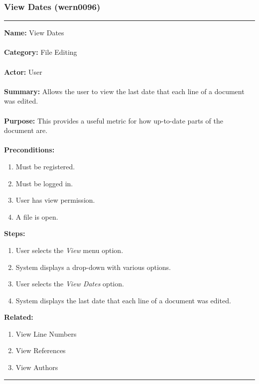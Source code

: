 \documentclass[11pt]{report}
\begin{document}
\subsubsection{View Dates (wern0096)}
\vspace{2pt}
\hrule
\vspace{8pt}
	\noindent\textbf{Name:} View Dates \\ \\
	\textbf{Category:} File Editing \\ \\
	\textbf{Actor:} User \\ \\
	\textbf{Summary:} Allows the user to view the last date that each line of a document was edited. \\ \\
	\textbf{Purpose:} This provides a useful metric for how up-to-date parts of the document are. \\ \\
	\textbf{Preconditions:} 
	\begin{enumerate}
		\item Must be registered.
		\item Must be logged in.
		\item User has view permission.
		\item A file is open.
	\end{enumerate}
	\textbf{Steps:}
	\begin{enumerate}
		\item User selects the \textit{View} menu option.
		\item System displays a drop-down with various options.
		\item User selects the \textit{View Dates} option.
		\item System displays the last date that each line of a document was edited.
	\end{enumerate}
	\textbf{Related:}
	\begin{enumerate}
		\item View Line Numbers
		\item View References
		\item View Authors
	\end{enumerate}
\vspace{8pt}
\hrule
\newpage
\end{document}
